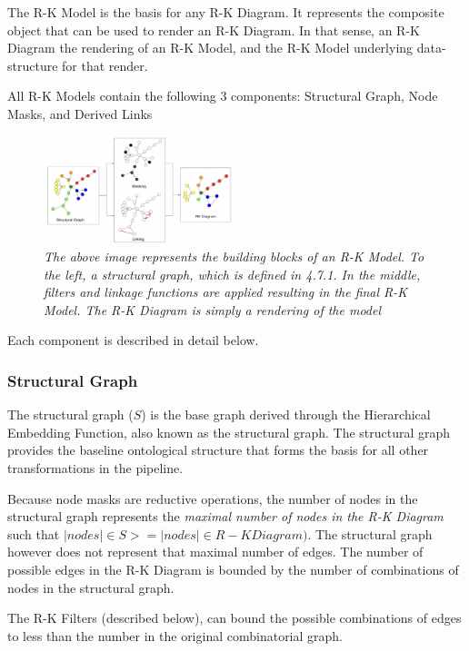 The R-K Model is the basis for any R-K Diagram. It represents the composite object that can be used to render an R-K Diagram. In that sense, an R-K Diagram the rendering of an R-K Model, and the R-K Model underlying data-structure for that render.

All R-K Models contain the following 3 components: Structural Graph, Node Masks, and Derived Links

\begin{figure}
	\centering
        \includegraphics[width=0.5\textwidth]{images/rkmodel.png}
	\caption{\textit{The above image represents the building blocks of an R-K Model. To the left, a structural graph, which is defined in 4.7.1. In the middle, filters and linkage functions are applied resulting in the final R-K Model. The R-K Diagram is simply a rendering of the model}}
	\label{fig:rkmodel}
\end{figure}

Each component is described in detail below.

\subsubsection{Structural Graph}

The structural graph ($S$) is the base graph derived through the Hierarchical Embedding Function, also known as the structural graph. The structural graph provides the baseline ontological structure that forms the basis for all other transformations in the pipeline.

Because node masks are reductive operations, the number of nodes in the structural graph represents the \textit{maximal number of nodes in the R-K Diagram} such that $|nodes| \in S >= |nodes| \in R-KDiagram)$. The structural graph however does not represent that maximal number of edges. The number of possible edges in the R-K Diagram is bounded by the number of combinations of nodes in the structural graph.

The R-K Filters (described below), can bound the possible combinations of edges to less than the number in the original combinatorial graph.

